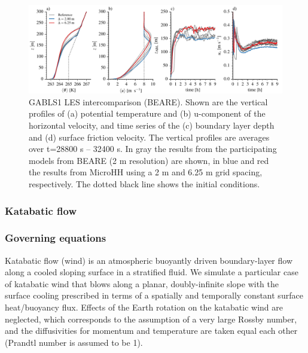 \documentclass[gmd]{copernicus}
\begin{document}
\begin{figure}[t]
\vspace*{2mm}
\begin{center}
\includegraphics[width=16.6cm]{figs/gmd_gabls_prof_tser.pdf}
\end{center}
\caption{GABLS1 LES intercomparison (BEARE). Shown are the vertical profiles of (a) potential temperature and (b) u-component of the horizontal velocity, and time series of the (c) boundary layer depth and (d) surface friction velocity. The vertical profiles are averages over t=28800 s -- 32400 s. In gray the results from the participating models from BEARE (2 m resolution) are shown, in blue and red the results from MicroHH using a 2 m and 6.25 m grid spacing, respectively. The dotted black line shows the initial conditions.}
\label{fig:gabls}
\end{figure}

\subsubsection{Katabatic flow}
\subsubsection{Governing equations}

\noindent Katabatic flow (wind) is an atmospheric buoyantly driven boundary-layer flow along a cooled sloping surface in a stratified fluid. We simulate a particular case of katabatic wind that blows along a planar, doubly-infinite slope with the surface cooling prescribed in terms of a spatially and temporally constant surface heat/buoyancy flux. Effects of the Earth rotation on the katabatic wind are neglected, which corresponds to the assumption of a very large Rossby number, and the diffusivities for momentum and temperature are taken equal each other (Prandtl number is assumed to be 1). 
\end{document}
